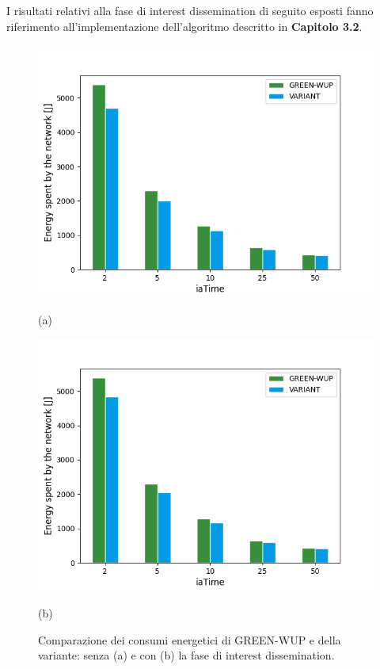 \documentclass[binding=0.6cm,TFA]{sapthesis}
\begin{document}
I risultati relativi alla fase di interest dissemination di seguito esposti fanno riferimento all'implementazione dell'algoritmo descritto in \textbf{Capitolo 3.2}.\\
\newpage

\begin{figure}[H]
    \centering
    \begin{minipage}{.5\textwidth}
        \centering
        \includegraphics[width=1\linewidth]{energy_plot.png}
        \caption*{(a)}
    \end{minipage}%
    \begin{minipage}{.5\textwidth}
        \centering
        \includegraphics[width=1\linewidth]{interest_energy_plot.png}
        \caption*{(b)}
    \end{minipage}
    \caption{Comparazione dei consumi energetici di GREEN-WUP e della variante: senza (a) e con (b) la fase di interest dissemination.}
\end{figure}
\end{document}
